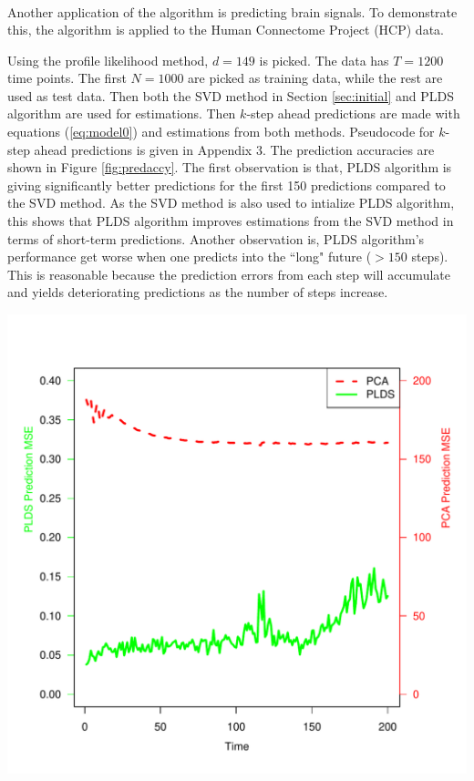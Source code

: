 \documentclass[fleqn]{article}
\let\oldref\ref
\renewcommand{\ref}[1]{(\oldref{#1})}
\begin{document}
\begin{center}
\[\begin{array}{lll}
\end{array}
\]
\label{fig:3d}
\end{center}

Another application of the algorithm is predicting brain signals. To demonstrate this, the algorithm is applied to the Human Connectome Project (HCP) data. 

Using the profile likelihood method, $d=149$ is picked. The data has $T=1200$ time points. The first $N = 1000$ are picked as training data, while the rest are used as test data. Then both the SVD method in Section \oldref{sec:initial} and PLDS algorithm are used for estimations. Then $k$-step ahead predictions are made with equations \ref{eq:model0} and estimations from both methods. Pseudocode for $k$-step ahead predictions is given in Appendix 3. The prediction accuracies are shown in Figure \oldref{fig:predaccy}. The first observation is that, PLDS algorithm is giving significantly better predictions for the first 150 predictions compared to the SVD method. As the SVD method is also used to intialize PLDS algorithm, this shows that PLDS algorithm improves estimations from the SVD method in terms of short-term predictions. Another observation is, PLDS algorithm's performance get worse when one predicts into the ``long" future ($>150$ steps). This is reasonable because the prediction errors from each step will accumulate and yields deteriorating predictions as the number of steps increase.

\begin{center}
\includegraphics[scale=0.5]{./figures/hcp_pred_accy.pdf}
\label{fig:predaccy}
\end{center}
\end{document}
